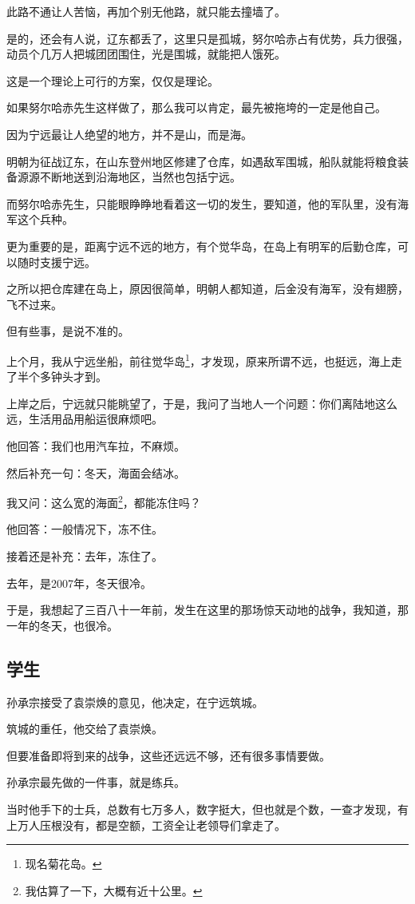\begin{multicols}{\theparacolNo}
		此路不通让人苦恼，再加个别无他路，就只能去撞墙了。

		是的，还会有人说，辽东都丢了，这里只是孤城，努尔哈赤占有优势，兵力很强，动员个几万人把城团团围住，光是围城，就能把人饿死。

		这是一个理论上可行的方案，仅仅是理论。

		如果努尔哈赤先生这样做了，那么我可以肯定，最先被拖垮的一定是他自己。

		因为宁远最让人绝望的地方，并不是山，而是海。

		明朝为征战辽东，在山东登州地区修建了仓库，如遇敌军围城，船队就能将粮食装备源源不断地送到沿海地区，当然也包括宁远。

		而努尔哈赤先生，只能眼睁睁地看着这一切的发生，要知道，他的军队里，没有海军这个兵种。

		更为重要的是，距离宁远不远的地方，有个觉华岛，在岛上有明军的后勤仓库，可以随时支援宁远。

		之所以把仓库建在岛上，原因很简单，明朝人都知道，后金没有海军，没有翅膀，飞不过来。

		但有些事，是说不准的。

		上个月，我从宁远坐船，前往觉华岛\footnote{现名菊花岛。}，才发现，原来所谓不远，也挺远，海上走了半个多钟头才到。

		上岸之后，宁远就只能眺望了，于是，我问了当地人一个问题：你们离陆地这么远，生活用品用船运很麻烦吧。

		他回答：我们也用汽车拉，不麻烦。

		然后补充一句：冬天，海面会结冰。

		我又问：这么宽的海面\footnote{我估算了一下，大概有近十公里。}，都能冻住吗？

		他回答：一般情况下，冻不住。

		接着还是补充：去年，冻住了。

		去年，是2007年，冬天很冷。

		于是，我想起了三百八十一年前，发生在这里的那场惊天动地的战争，我知道，那一年的冬天，也很冷。

		\subsection{学生}
		孙承宗接受了袁崇焕的意见，他决定，在宁远筑城。

		筑城的重任，他交给了袁崇焕。

		但要准备即将到来的战争，这些还远远不够，还有很多事情要做。

		孙承宗最先做的一件事，就是练兵。

		当时他手下的士兵，总数有七万多人，数字挺大，但也就是个数，一查才发现，有上万人压根没有，都是空额，工资全让老领导们拿走了。


\end{multicols}
